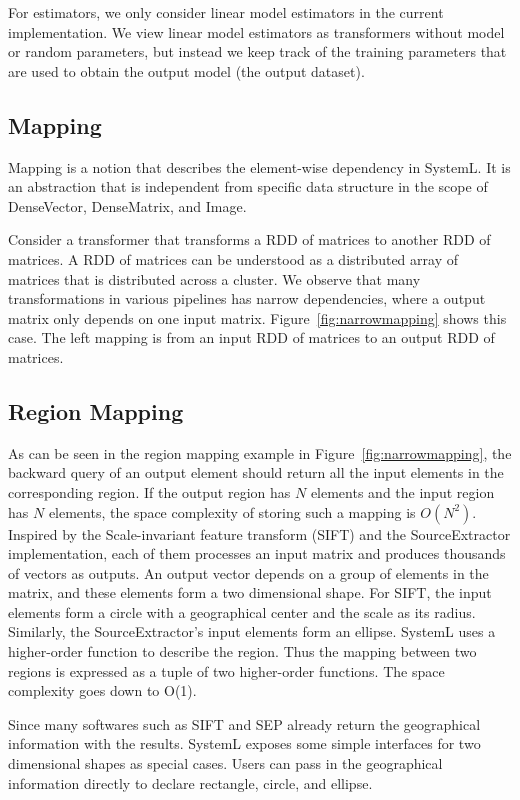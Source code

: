 \documentclass{sig-alternate}
\begin{document}
For estimators, we only consider linear model estimators in the current implementation. 
We view linear model estimators as transformers without model or random parameters, 
but instead we keep track of the training parameters that are used to obtain the output model (the output dataset). 

\subsection{Mapping}
\label{sec:Design-Mapping}
Mapping is a notion that describes the element-wise dependency in SystemL. 
It is an abstraction that is independent from specific data structure in the scope of DenseVector, DenseMatrix, and Image.

Consider a transformer that transforms a RDD of matrices to another RDD of matrices.
A RDD of matrices can be understood as a distributed array of matrices that is distributed across a cluster.
We observe that many transformations in various pipelines has narrow dependencies, where a output matrix
only depends on one input matrix. Figure~\ref{fig:narrowmapping} shows this case. 
The left mapping is from an input RDD of matrices to an output RDD of matrices. 




\subsection{Region Mapping}
\label{sec:Design-RegionMapping}
As can be seen in the region mapping example in Figure~\ref{fig:narrowmapping}, the backward query of an output element should return all the input elements in the corresponding region. If the output region has $N$ elements and the input region has $N$ elements, the space complexity of storing such a mapping is $O(N^2)$. 
Inspired by the Scale-invariant feature transform (SIFT) and the SourceExtractor implementation, each of them processes an input matrix and produces thousands of vectors as outputs. An output vector depends on a group of elements in the matrix, and these elements form a two dimensional shape. 
For SIFT, the input elements form a circle with a geographical center and the scale as its radius.
Similarly, the SourceExtractor's input elements  form an ellipse. 
SystemL uses a higher-order function to describe the region. 
Thus the mapping between two regions is expressed as a tuple of two higher-order functions.
The space complexity goes down to O(1).

Since many softwares such as SIFT and SEP already return the geographical information with the results.
SystemL exposes some simple interfaces for two dimensional shapes as special cases.
Users can pass in the geographical information directly to declare rectangle, circle, and ellipse.
\end{document}

